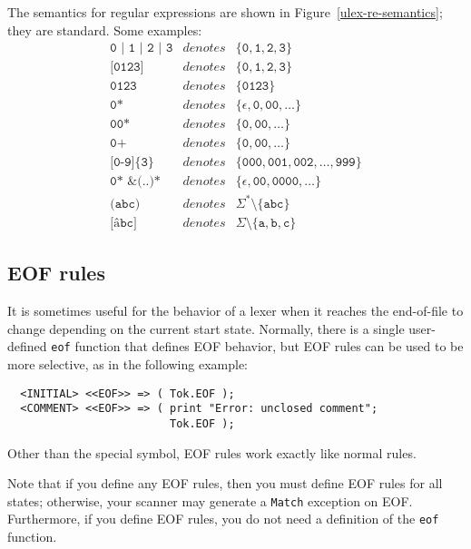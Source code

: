 The semantics for \ulex{} regular expressions are shown in Figure~\ref{ulex-re-semantics}; they are standard.  Some examples:
\[
\begin{array}{rcl}
\texttt{0 | 1 | 2 | 3}	& \textit{denotes} &
    \{ \texttt{0}, \texttt{1}, \texttt{2}, \texttt{3} \}	\\
\texttt{[0123]}	& \textit{denotes} &
    \{ \texttt{0}, \texttt{1}, \texttt{2}, \texttt{3} \}	\\
\texttt{0123}	& \textit{denotes} &
    \{ \texttt{0123} \}						\\
\texttt{0*}	& \textit{denotes} &
    \{ \epsilon, \texttt{0}, \texttt{00}, \dots \}		\\
\texttt{00*}	& \textit{denotes} &
    \{ \texttt{0}, \texttt{00}, \dots \}		\\
\texttt{0+}	& \textit{denotes} &
    \{ \texttt{0}, \texttt{00}, \dots \}		\\
\texttt{[0-9]\{3\}}	& \textit{denotes} &
    \{ \texttt{000}, \texttt{001}, \texttt{002}, \dots, \texttt{999} \}	\\
\texttt{0* \& (..)*}	& \textit{denotes} &
    \{ \epsilon, \texttt{00}, \texttt{0000}, \dots \}	\\
\texttt{\^{ }(abc)}	& \textit{denotes} &
    \Sigma^* \setminus \{ \texttt{abc} \}	\\
\texttt{[\^{ }abc]}	& \textit{denotes} &
    \Sigma \setminus \{ \texttt{a}, \texttt{b}, \texttt{c} \}
\end{array}
\]

\subsection{EOF rules}\label{sec:eof-rules}

It is sometimes useful for the behavior of a lexer when it reaches the end-of-file to change
depending on the current start state.
Normally, there is a single user-defined \texttt{eof} function that defines EOF behavior, but
EOF rules can be used to be more selective, as in the following example:
\begin{verbatim}
  <INITIAL> <<EOF>> => ( Tok.EOF );
  <COMMENT> <<EOF>> => ( print "Error: unclosed comment";
                         Tok.EOF );
\end{verbatim}
Other than the special  symbol, EOF rules work exactly like normal rules.

Note that if you define any EOF rules, then you must define EOF rules for all states;
otherwise, your scanner may generate a \texttt{Match} exception on EOF.
Furthermore, if you define EOF rules, you do not need a definition of the \texttt{eof}
function.

